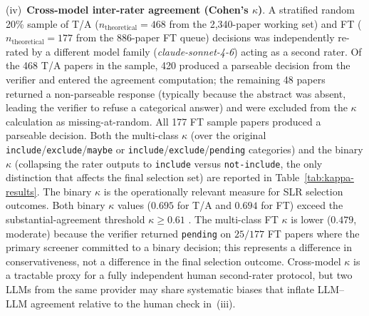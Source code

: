 (iv)~\textbf{Cross-model inter-rater agreement (Cohen's $\kappa$)}.
A stratified random 20\% sample of T/A ($n_{\text{theoretical}} = 468$ from
the 2{,}340-paper working set) and FT ($n_{\text{theoretical}} = 177$ from
the 886-paper FT queue) decisions was independently re-rated by a different
model family (\textit{claude-sonnet-4-6}) acting as a second rater. Of the
468 T/A papers in the sample, 420 produced a parseable decision from the
verifier and entered the agreement computation; the remaining 48 papers
returned a non-parseable response (typically because the abstract was
absent, leading the verifier to refuse a categorical answer) and were
excluded from the $\kappa$ calculation as missing-at-random. All 177 FT
sample papers produced a parseable decision. Both the multi-class
$\kappa$ (over the original \texttt{include}/\texttt{exclude}/\texttt{maybe}
or \texttt{include}/\texttt{exclude}/\texttt{pending} categories) and the
binary $\kappa$ (collapsing the rater outputs to
\texttt{include} versus \texttt{not-include}, the only distinction that
affects the final selection set) are reported in
Table~\ref{tab:kappa-results}. The binary $\kappa$ is the operationally
relevant measure for SLR selection outcomes. Both binary $\kappa$ values
($0.695$ for T/A and $0.694$ for FT) exceed the substantial-agreement
threshold $\kappa \geq 0.61$ \cite{landiskoch1977}. The multi-class FT
$\kappa$ is lower ($0.479$, moderate) because the verifier returned
\texttt{pending} on $25/177$ FT papers where the primary screener committed
to a binary decision; this represents a difference in conservativeness, not
a difference in the final selection outcome. Cross-model $\kappa$ is a
tractable proxy for a fully independent human second-rater protocol, but two
LLMs from the same provider may share systematic biases that inflate
LLM--LLM agreement relative to the human check in~(iii).



